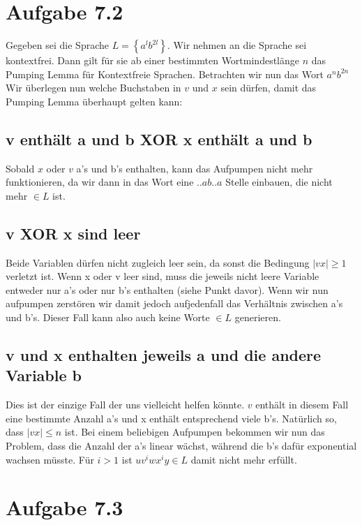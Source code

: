\documentclass{article}
\begin{document}
\section*{Aufgabe 7.2}
Gegeben sei die Sprache $L = \left\{ a^lb^{2l} \right\}$. Wir nehmen an die Sprache sei kontextfrei. Dann gilt für sie ab einer bestimmten Wortmindestlänge $n$ das Pumping Lemma für Kontextfreie Sprachen. Betrachten wir nun das Wort $a^nb^{2n}$ Wir überlegen nun welche Buchstaben in $v$ und $x$ sein dürfen, damit das Pumping Lemma überhaupt gelten kann:

\subsection*{v enthält a und b XOR x enthält a und b}
Sobald $x$ oder $v$ a's und b's enthalten, kann das Aufpumpen nicht mehr funktionieren, da wir dann in das Wort eine $..ab..a$ Stelle einbauen, die nicht mehr $\in L$ ist.

\subsection*{v XOR x sind leer}
Beide Variablen dürfen nicht zugleich leer sein, da sonst die Bedingung $|vx|\geq 1$ verletzt ist. Wenn x oder v leer sind, muss die jeweils nicht leere Variable entweder nur a's oder nur b's enthalten (siehe Punkt davor). Wenn wir nun aufpumpen zerstören wir damit jedoch aufjedenfall das Verhältnis zwischen a's und b's. Dieser Fall kann also auch keine Worte $\in L$ generieren.

\subsection*{v und x enthalten jeweils a und die andere Variable b}
Dies ist der einzige Fall der uns vielleicht helfen könnte. $v$ enthält in diesem Fall eine bestimmte Anzahl a's und x enthält entsprechend viele b's. Natürlich so, dass $|vx| \leq n$ ist. Bei einem beliebigen Aufpumpen bekommen wir nun das Problem, dass die Anzahl der a's linear wächst, während die b's dafür exponential wachsen müsste. Für $i>1$ ist $uv^iwx^iy\in L$ damit nicht mehr erfüllt.


\section*{Aufgabe 7.3}
\end{document}
